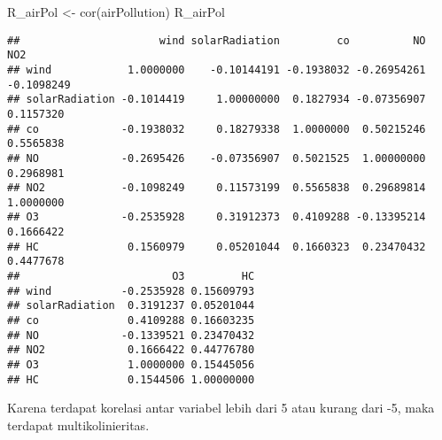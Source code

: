\documentclass[
]{article}
\newenvironment{Shaded}{\begin{snugshade}}{\end{snugshade}}
\newcommand{\FunctionTok}[1]{\textcolor[rgb]{0.00,0.00,0.00}{#1}}
\newcommand{\NormalTok}[1]{#1}
\newcommand{\OtherTok}[1]{\textcolor[rgb]{0.56,0.35,0.01}{#1}}
\begin{document}
\begin{Shaded}
\begin{Highlighting}[]
\NormalTok{R\_airPol }\OtherTok{\textless{}{-}} \FunctionTok{cor}\NormalTok{(airPollution)}
\NormalTok{R\_airPol}
\end{Highlighting}
\end{Shaded}

\begin{verbatim}
##                      wind solarRadiation         co          NO        NO2
## wind            1.0000000    -0.10144191 -0.1938032 -0.26954261 -0.1098249
## solarRadiation -0.1014419     1.00000000  0.1827934 -0.07356907  0.1157320
## co             -0.1938032     0.18279338  1.0000000  0.50215246  0.5565838
## NO             -0.2695426    -0.07356907  0.5021525  1.00000000  0.2968981
## NO2            -0.1098249     0.11573199  0.5565838  0.29689814  1.0000000
## O3             -0.2535928     0.31912373  0.4109288 -0.13395214  0.1666422
## HC              0.1560979     0.05201044  0.1660323  0.23470432  0.4477678
##                        O3         HC
## wind           -0.2535928 0.15609793
## solarRadiation  0.3191237 0.05201044
## co              0.4109288 0.16603235
## NO             -0.1339521 0.23470432
## NO2             0.1666422 0.44776780
## O3              1.0000000 0.15445056
## HC              0.1544506 1.00000000
\end{verbatim}

Karena terdapat korelasi antar variabel lebih dari 5 atau kurang dari
-5, maka terdapat multikolinieritas.
\end{document}
